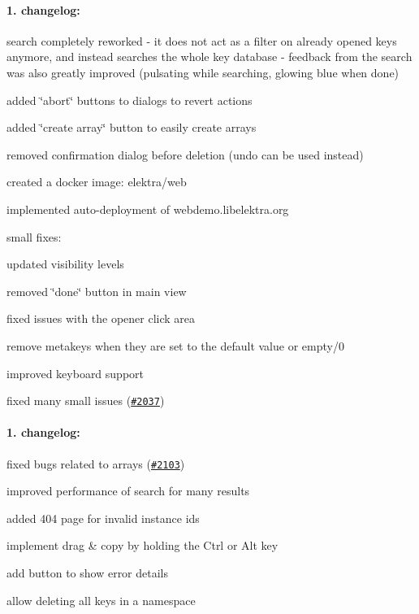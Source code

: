 \paragraph*{1. changelog\+:}


\begin{DoxyItemize}
\item search completely reworked -\/ it does not act as a filter on already opened keys anymore, and instead searches the whole key database -\/ feedback from the search was also greatly improved (pulsating while searching, glowing blue when done)
\item added \char`\"{}abort\char`\"{} buttons to dialogs to revert actions
\item added \char`\"{}create array\char`\"{} button to easily create arrays
\item removed confirmation dialog before deletion (undo can be used instead)
\item created a docker image\+: {\ttfamily elektra/web}
\item implemented auto-\/deployment of webdemo.\+libelektra.\+org
\item small fixes\+:
\begin{DoxyItemize}
\item updated visibility levels
\item removed \char`\"{}done\char`\"{} button in main view
\item fixed issues with the opener click area
\item remove metakeys when they are set to the default value or empty/0
\item improved keyboard support
\item fixed many small issues (\href{https://issues.libelektra.org/2037}{\tt \#2037})
\end{DoxyItemize}
\end{DoxyItemize}

\paragraph*{1. changelog\+:}


\begin{DoxyItemize}
\item fixed bugs related to arrays (\href{https://issues.libelektra.org/2103}{\tt \#2103})
\item improved performance of search for many results
\item added 404 page for invalid instance ids
\item implement drag \& copy by holding the Ctrl or Alt key
\item add button to show error details
\item allow deleting all keys in a namespace
\end{DoxyItemize}

